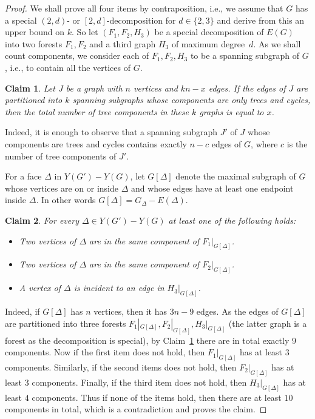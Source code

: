\documentclass[a4paper,10pt]{article}
\theoremstyle{plain}
\newtheorem{claim}{Claim}
\begin{document}
\begin{proof}
 We shall prove all four items by contraposition, i.e., we assume that $G$ has a special $(2,d)$- or $[2,d]$-decomposition for $d \in \{2,3\}$ and derive from this an upper bound on $k$.
 So let $(F_1,F_2,H_3)$ be a special decomposition of $E(G)$ into two forests $F_1,F_2$ and a third graph $H_3$ of maximum degree~$d$.
 As we shall count components, we consider each of $F_1,F_2,H_3$ to be a spanning subgraph of $G$, i.e., to contain all the vertices of $G$.
  
 \begin{claim}\label{claim:tree-components}
  Let $J$ be a graph with $n$ vertices and $kn-x$ edges.
  If the edges of $J$ are partitioned into $k$ spanning subgraphs whose components are only trees and cycles, then the total number of tree components in these $k$ graphs is equal to $x$.
 \end{claim}

 Indeed, it is enough to observe that a spanning subgraph $J'$ of $J$ whose components are trees and cycles contains exactly $n-c$ edges of $G$, where $c$ is the number of tree components of $J'$.
 
 \medskip

 For a face $\Delta$ in $Y(G') - Y(G)$, let $G[\Delta]$ denote the maximal subgraph of $G$ whose vertices are on or inside $\Delta$ and whose edges have at least one endpoint inside $\Delta$. In other words $G[\Delta]=G_{\Delta}-E(\Delta)$.
 
 \begin{claim}\label{claim:in-Delta}
  For every $\Delta \in Y(G') - Y(G)$ at least one of the following holds:
  \begin{itemize}
   \item Two vertices of $\Delta$ are in the same component of $F_1|_{G[\Delta]}$.
   \item Two vertices of $\Delta$ are in the same component of $F_2|_{G[\Delta]}$.
   \item A vertex of $\Delta$ is incident to an edge in $H_3|_{G[\Delta]}$.
  \end{itemize}
 \end{claim} 
 
 Indeed, if $G[\Delta]$ has $n$ vertices, then it has $3n-9$ edges.
 As the edges of $G[\Delta]$ are partitioned into three forests $F_1|_{G[\Delta]},F_2|_{G[\Delta]},H_3|_{G[\Delta]}$ (the latter graph is a forest as the decomposition is special), by Claim~\ref{claim:tree-components} there are in total exactly $9$ components.
 Now if the first item does not hold, then $F_1|_{G[\Delta]}$ has at least $3$ components.
 Similarly, if the second items does not hold, then $F_2|_{G[\Delta]}$ has at least $3$ components.
 Finally, if the third item does not hold, then $H_3|_{G[\Delta]}$ has at least $4$ components.
 Thus if none of the items hold, then there are at least $10$ components in total, which is a contradiction and proves the claim.
 

\end{proof}
\end{document}
